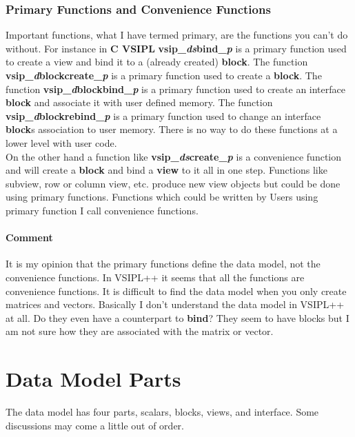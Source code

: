 \documentclass[11pt, oneside]{article}
\newcommand{\cvl}{\ttbf{C VSIPL}}
\newcommand{\ttbf}[1]{{\ttfamily \bfseries #1}}
\newcommand{\blk}{\ttbf{block}}
\newcommand{\vw}{\ttbf{view}}
\begin{document}
\subsubsection{Primary Functions and Convenience Functions}
Important functions, what I have termed primary, are the functions you can't do without. For instance in \cvl{} \ttbf{vsip\_\emph{ds}bind\_\emph{p}} is a primary function used to create a view and bind it to a (already created) \blk{}. The function \ttbf{vsip\_\emph{d}blockcreate\_\emph{p}} is a primary function used to create a \blk{}. The function \ttbf{vsip\_\emph{d}blockbind\_\emph{p}} is a primary function used to create an interface \blk{} and associate it with user defined memory. The function \ttbf{vsip\_\emph{d}blockrebind\_\emph{p}} is a primary function used to change an interface \blk{}s association to user memory.  There is no way to do these functions at a lower level with user code.
\\[6pt]
On the other hand a function like \ttbf{vsip\_\emph{ds}create\_\emph{p}} is a convenience function and will create a \blk{} and bind a \vw{} to it all in one step.  Functions like subview, row or column view, etc.  produce new view objects but could be done using primary functions. Functions which could be written by Users using primary function I call convenience functions.
\paragraph{Comment} It is my opinion that the primary functions define the data model, not the convenience functions.  In VSIPL++ it seems that all the functions are convenience functions.  It is difficult to find the data model when you only create matrices and vectors. Basically I don't understand the data model in VSIPL++ at all.  Do they even have a counterpart to \ttbf{bind}?  They seem to have blocks but I am not sure how they are associated with the matrix or vector.
%
\section{ Data Model Parts}
The data model has four parts, scalars, blocks, views, and interface.  Some discussions may come a little out of order.
\end{document}
